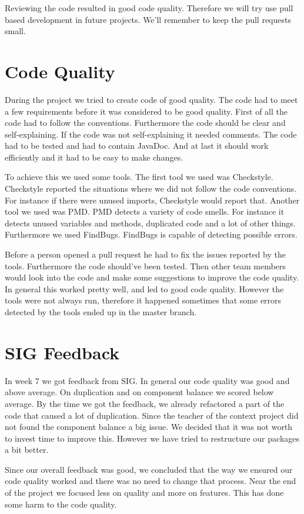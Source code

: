 Reviewing the code resulted in good code quality. Therefore we will try use pull based development in future projects. We'll remember to keep the pull requests small. 

\section{Code Quality}\label{codequality}
During the project we tried to create code of good quality. The code had to meet a few requirements before it was considered to be good quality. First of all the code had to follow the conventions. Furthermore the code should be clear and self-explaining. If the code was not self-explaining it needed comments. The code had to be tested and had to contain JavaDoc. And at last it should work efficiently and it had to be easy to make changes.
 
To achieve this we used some tools. The first tool we used was Checkstyle. Checkstyle reported the situations where we did not follow the code conventions. For instance if there were unused imports, Checkstyle would report that. 
Another tool we used was PMD. PMD detects a variety of code smells. For instance it detects unused variables and methods, duplicated code and a lot of other things.
Furthermore we used FindBugs. FindBugs is capable of detecting possible errors.

Before a person opened a pull request he had to fix the issues reported by the tools. Furthermore the code should've been tested. Then other team members would look into the code and make some suggestions to improve the code quality.
In general this worked pretty well, and led to good code quality. However the tools were not always run, therefore it happened sometimes that some errors detected by the tools ended up in the master branch. 

\section{SIG Feedback}
In week 7 we got feedback from SIG. In general our code quality was good and above average. On duplication and on component balance we scored below average. By the time we got the feedback, we already refactored a part of the code that caused a lot of duplication. Since the teacher of the context project did not found the component balance a big issue. We decided that it was not worth to invest time to improve this. However we have tried to restructure our packages a bit better. 

Since our overall feedback was good, we concluded that the way we ensured our code quality worked and there was no need to change that process.
Near the end of the project we focused less on quality and more on features. This has done some harm to the code quality.